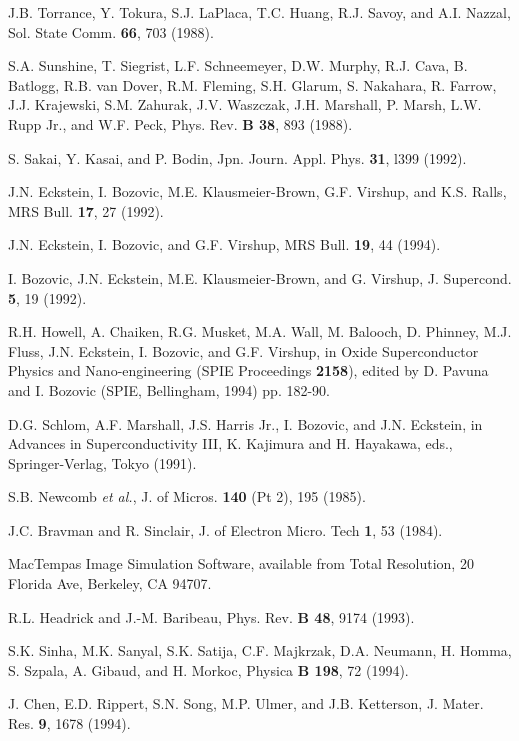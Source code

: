 \begin{references}

 J.B. Torrance, Y. Tokura, S.J. LaPlaca, T.C. Huang,
R.J. Savoy, and A.I. Nazzal, Sol. State Comm. {\bf 66}, 703
(1988).

 S.A. Sunshine, T. Siegrist, L.F. Schneemeyer,
D.W. Murphy, R.J. Cava, B. Batlogg, R.B.  van Dover, R.M. Fleming,
S.H. Glarum, S. Nakahara, R. Farrow, J.J. Krajewski, S.M.  Zahurak,
J.V. Waszczak, J.H. Marshall, P. Marsh, L.W. Rupp Jr., and W.F. Peck,
Phys.  Rev. {\bf B 38}, 893 (1988).

 S. Sakai, Y. Kasai, and P. Bodin,
Jpn. Journ. Appl. Phys. {\bf 31}, l399 (1992).

 J.N. Eckstein, I. Bozovic, M.E. Klausmeier-Brown,
G.F. Virshup, and K.S. Ralls, MRS Bull. {\bf 17}, 27 (1992).

 J.N. Eckstein, I. Bozovic, and G.F. Virshup, MRS
Bull. {\bf 19}, 44 (1994).

 I. Bozovic, J.N. Eckstein, M.E. Klausmeier-Brown,
and G. Virshup, J. Supercond. {\bf 5}, 19 (1992).

 R.H. Howell, A. Chaiken, R.G. Musket, M.A. Wall,
M. Balooch, D. Phinney, M.J. Fluss, J.N. Eckstein, I. Bozovic, and
G.F. Virshup, in Oxide Superconductor Physics and Nano-engineering
(SPIE Proceedings {\bf 2158}), edited by D. Pavuna and I. Bozovic
(SPIE, Bellingham, 1994) pp. 182-90.

 D.G. Schlom, A.F. Marshall, J.S. Harris Jr.,
I. Bozovic, and J.N. Eckstein, in Advances in Superconductivity III,
K. Kajimura and H. Hayakawa, eds., Springer-Verlag, Tokyo (1991).

 S.B. Newcomb {\it et al.}, J. of Micros. {\bf 140}
(Pt 2), 195 (1985).

 J.C. Bravman and R. Sinclair, J. of Electron
Micro. Tech {\bf 1}, 53 (1984).

 MacTempas Image Simulation Software, available
from Total Resolution, 20 Florida Ave, Berkeley, CA 94707.

 R.L. Headrick and J.-M. Baribeau, Phys. Rev. {\bf B
48}, 9174 (1993).

 S.K. Sinha, M.K. Sanyal, S.K. Satija, C.F. Majkrzak,
D.A. Neumann, H. Homma, S.  Szpala, A. Gibaud, and H. Morkoc, Physica
{\bf B 198}, 72 (1994).

 J. Chen, E.D. Rippert, S.N. Song, M.P. Ulmer, and
J.B. Ketterson, J. Mater. Res. {\bf 9}, 1678 (1994).


\end{references}
